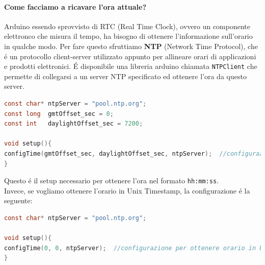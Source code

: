 \paragraph{Come facciamo a ricavare l'ora attuale?\\}
Arduino essendo sprovvisto di RTC (Real Time Clock), ovvero un componente elettronco che misura il tempo, ha bisogno di ottenere l'informazione
sull'orario in qualche modo.
Per fare questo sfruttiamo \textbf{NTP} (Network Time Protocol), che é un protocollo client-server utilizzato appunto per allineare orari di applicazioni
e prodotti elettronici.
É disponibile una libreria arduino chiamata \texttt{NTPClient} che permette di collegarsi a un server NTP specificato ed ottenere
l'ora da questo server.

\begin{lstlisting}[autogobble, style=c, language=C]
const char* ntpServer = "pool.ntp.org";
const long  gmtOffset_sec = 0;
const int   daylightOffset_sec = 7200;

void setup(){
configTime(gmtOffset_sec, daylightOffset_sec, ntpServer);  //configurazione per ottenere orario in formato hh:mm:ss con fuso orario Europeo
}
\end{lstlisting}

Questo é il setup necessario per ottenere l'ora nel formato \texttt{hh:mm:ss}.\\

Invece, se vogliamo ottenere l'orario in Unix Timestamp, la configurazione é la seguente:
\begin{lstlisting}[autogobble, style=c, language=C]
const char* ntpServer = "pool.ntp.org";

void setup(){
configTime(0, 0, ntpServer);  //configurazione per ottenere orario in Unix Timestamp
}
\end{lstlisting}

